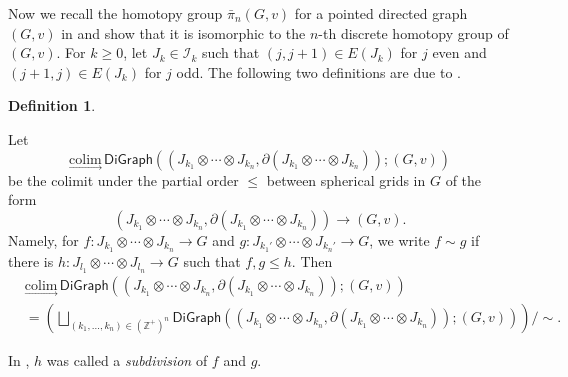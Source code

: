 \documentclass[oneside, 12pt]{amsart}
\numberwithin{equation}{section}
\theoremstyle{plain}
\theoremstyle{definition}
\newtheorem{definition}[theorem]{Definition}
\theoremstyle{remark}
\newcommand{\Z}{\mathbb{Z}}
\begin{document}
	
	Now we recall the homotopy group $\bar{\pi}_n(G,v)$ for a pointed directed graph $(G,v)$ in \cite{LWYZ} and show that it is isomorphic to the $n$-th discrete homotopy group of $(G,v)$. For $k\ge0$, let $J_k\in\mathcal{I}_k$ such that $(j,j+1)\in E(J_k)$ for $j$ even and $(j+1,j)\in E(J_k)$ for $j$ odd. The following two definitions are due to \cite{LWYZ}.
	\begin{definition}
		\label{LWYZ1}
		
		Let 
		\[
		\underset{\rightarrow}{\mathrm{colim}}\,\mathsf{DiGraph}\left(\left(J_{k_1}\otimes\cdots\otimes J_{k_n},\partial\left(J_{k_1}\otimes\cdots\otimes J_{k_n}\right)\right);\left(G,v\right)\right)
		\]
		be the colimit under the partial order $\le$ between spherical grids in $G$ of the form
		\[
		\left(J_{k_1}\otimes\cdots\otimes J_{k_n},\partial\left(J_{k_1}\otimes\cdots\otimes J_{k_n}\right)\right)\to\left(G,v\right).
		\]
		Namely, for $f\colon J_{k_1}\otimes\cdots\otimes J_{k_n}\to G$ and $g\colon J_{k_1'}\otimes\cdots\otimes J_{k_n'}\to G$, we write $f\sim g$ if there is $h\colon J_{l_1}\otimes\cdots\otimes J_{l_n}\to G$ such that $f,g\le h$. Then
		\begin{align*}
			&\underset{\rightarrow}{\mathrm{colim}}\,\mathsf{DiGraph}\left(\left(J_{k_1}\otimes\cdots\otimes J_{k_n},\partial\left(J_{k_1}\otimes\cdots\otimes J_{k_n}\right)\right);\left(G,v\right)\right)\\
			&=\left(\bigsqcup_{(k_1,\ldots,k_n)\in(\Z^+)^n}\mathsf{DiGraph}\left(\left(J_{k_1}\otimes\cdots\otimes J_{k_n},\partial\left(J_{k_1}\otimes\cdots\otimes J_{k_n}\right)\right);\left(G,v\right)\right)\right)/\sim.
		\end{align*}
	\end{definition}
	In \cite{LWYZ}, $h$ was called a \emph{subdivision} of $f$ and $g$.
\end{document}
